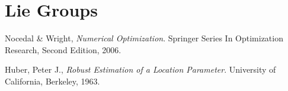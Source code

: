 \documentclass[reqno]{amsart}
\numberwithin{equation}{section}
\begin{document}
\section{Lie Groups}

\begin{thebibliography}{999}

Nocedal \& Wright,
\emph{Numerical Optimization}.
Springer Series In Optimization Research,
Second Edition,
2006.

Huber, Peter J.,
\emph{Robust Estimation of a Location Parameter}.
University of California, Berkeley,
1963.

\end{thebibliography}
\end{document}
